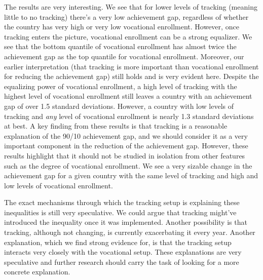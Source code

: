\documentclass[11pt, a4paper]{article}\usepackage[]{graphicx}\usepackage[]{color}
\begin{document}

The results are very interesting. We see that for lower levels of tracking (meaning little to no tracking) there's a very low achievement gap, regardless of whether the country has very high or very low vocational enrollment. However, once tracking enters the picture, vocational enrollment can be a strong equalizer. We see that the bottom quantile of vocational enrollment has almost twice the achievement gap as the top quantile for vocational enrollment. Moreover, our earlier interpretation (that tracking is more important than vocational enrollment for reducing the achievement gap) still holds and is very evident here. Despite the equalizing power of vocational enrollment, a high level of tracking with the highest level of vocational enrollment still leaves a country with an achievement gap of over 1.5 standard deviations. However, a country with low levels of tracking and \textit{any} level of vocational enrollment is nearly 1.3 standard deviations at best. A key finding from these results is that tracking is a reasonable explanation of the 90/10 achievement gap, and we should consider it as a very important component in the reduction of the achievement gap. However, these results highlight that it should not be studied in isolation from other features such as the degree of vocational enrollment. We see a very sizable change in the achievement gap for a given country with the same level of tracking and high and low levels of vocational enrollment.

The exact mechanisms through which the tracking setup is explaining these inequalities is still very speculative. We could argue that tracking might've introduced the inequality once it was implemented. Another possibility is that tracking, although not changing, is currently exacerbating it every year. Another explanation, which we find strong evidence for, is that the tracking setup interacts very closely with the vocational setup. These explanations are very speculative and further research should carry the task of looking for a more concrete explanation.

\end{document}
